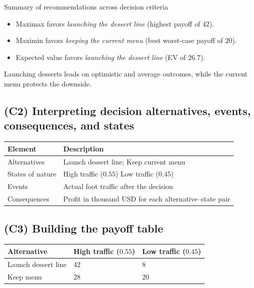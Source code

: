 \documentclass[11pt]{article}
\begin{document}
	Summary of recommendations across decision criteria
	\begin{itemize}
		\item Maximax favors \emph{launching the dessert line} (highest payoff of $42$).
		\item Maximin favors \emph{keeping the current menu} (best worst-case payoff of $20$).
		\item Expected value favors \emph{launching the dessert line} (EV of $26.7$).
	\end{itemize}
	
	
	Launching desserts leads on optimistic and average outcomes, while the current menu protects the downside.
	
	\subsection*{(C2) Interpreting decision alternatives, events, consequences, and states}
	
	\hypertarget{problem1-c2}{}
	
	\begin{center}
		\begin{tabular}{ll}
			\toprule
			Element & Description \\
			\midrule
			Alternatives & Launch dessert line; Keep current menu \\
			States of nature & High traffic
			($0.55$)
			Low traffic
			($0.45$) \\
			Events & Actual foot traffic after the decision \\
			Consequences & Profit in thousand USD for each alternative–state pair \\
			\bottomrule
		\end{tabular}
	\end{center}
	
	\subsection*{(C3) Building the payoff table}
	
	\hypertarget{problem1-c3}{}
	
	\begin{center}
		\begin{tabular}{lll}
			\toprule
			Alternative & High traffic
			($0.55$) & Low traffic
			($0.45$) \\
			\midrule
			Launch dessert line & 42 & 8 \\
			Keep menu & 28 & 20 \\
			\bottomrule
		\end{tabular}
	\end{center}
	
\end{document}
